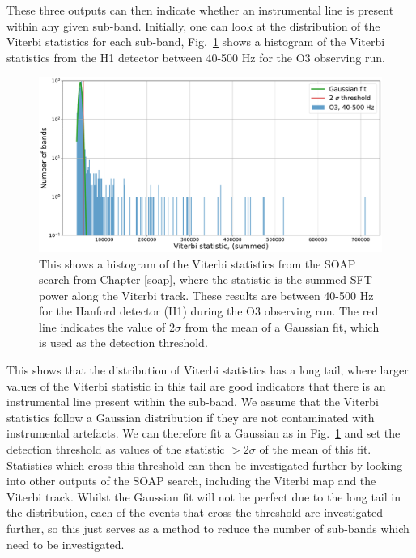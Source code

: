 These three outputs can then indicate whether an instrumental line is present within any given sub-band.
Initially, one can look at the distribution of the Viterbi statistics for each sub-band, Fig.~\ref{detchar:soap:rankedstats} shows a histogram of the Viterbi statistics from the H1 detector between 40-500 Hz for the O3 observing run.
%
\begin{figure}[ht]
	\centering
	\includegraphics[width=\textwidth]{C6_detchar/statistic_hists_O3_H1.pdf}
        \caption[Viterbi statistics for H1 in O3, 40-500 Hz]{This shows a
histogram of the Viterbi statistics from the SOAP search from Chapter
\ref{soap}, where the statistic is the summed \gls{SFT}  power along the
Viterbi track. These results are between 40-500 Hz for the Hanford detector
(H1) during the O3 observing run. The red line indicates the value of $2 \sigma$ from the mean of a Gaussian fit, which is used as the detection threshold. }
\label{detchar:soap:rankedstats}

\end{figure}
%
This shows that the distribution of Viterbi statistics has a long tail,
where larger values of the Viterbi statistic in this tail are good indicators that there is
an instrumental line present within the sub-band.  We assume that the Viterbi statistics follow a Gaussian distribution if they are not contaminated with instrumental artefacts.
We can therefore fit a Gaussian as in Fig.~\ref{detchar:soap:rankedstats} and set the detection threshold as values of the statistic $> 2 \sigma$ of the mean of this fit.
Statistics which cross this threshold can then be investigated further by looking into other outputs of the SOAP search, including the Viterbi map and the Viterbi track.
Whilst the Gaussian fit will not be perfect due to the long tail in the distribution, each of the events that cross the threshold are investigated further, so this just serves as a method to reduce the number of sub-bands which need to be investigated.

